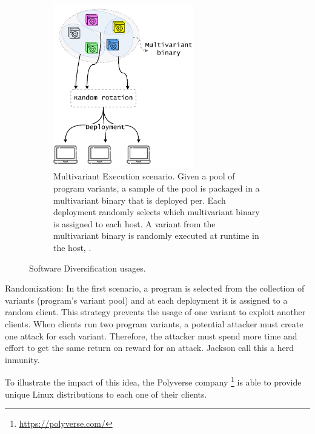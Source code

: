 \begin{figure}[h]
\begin{subfigure}[t]{0.45\textwidth}
    \end{subfigure}
    \hspace{1.5mm}
    \hspace{1.5mm}
    \begin{subfigure}[t]{0.45\textwidth}
        \centering
        \includegraphics[height=2.8in]{diagrams/mve.pdf}
        \caption{Multivariant Execution scenario. Given a pool of program variants, a sample of the pool is packaged in a multivariant binary that is deployed per. Each deployment randomly selects which multivariant binary is assigned to each host. A variant from the multivariant binary is randomly executed at runtime in the host, .}        \label{diagrams:sota:mve}

    \end{subfigure}
    \caption{Software Diversification usages. }
\end{figure}



\begin{usage}{Randomization:}
    \label{usage:randomization}
    \normalfont
    In the first scenario, a program is selected from the collection of variants (program's variant pool) and at each deployment it is assigned to a random client. This strategy prevents the usage of one variant to exploit another clients. When clients run two program variants, a potential attacker must create one attack for each variant. Therefore, the attacker must spend more time and effort to get the same return on reward for an attack. Jackson \etal \cite{jackson} call this a herd inmunity.

    To illustrate the impact of this idea, the Polyverse company \footnote{\url{https://polyverse.com/}} is able to provide unique Linux distributions to each one of their clients. 

    
    
\end{usage}

